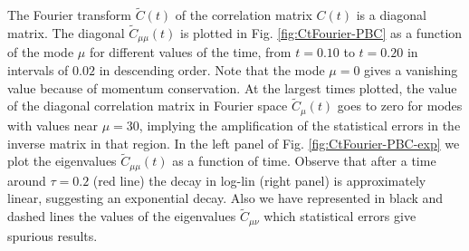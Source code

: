 \documentclass[b5paper,openright,10pt]{book}
\begin{document}
The Fourier transform $\tilde{C}(t)$  of the correlation matrix $C(t)$
is a diagonal matrix.  The diagonal $\tilde{C}_{\mu\mu}(t)$ is plotted
in Fig.   \ref{fig:CtFourier-PBC} as a function of the mode
$\mu$      for      different       values      of      the      time,
from $t=0.10$ to $t=0.20$ in intervals of $0.02$ in  descending   order.   Note that the  mode
$\mu=0$ gives a vanishing value  because of momentum conservation. At the largest times plotted,
the  value  of  the  diagonal  correlation  matrix  in  Fourier  space
$\tilde{C}_\mu(t)$ goes to  zero for modes with  values near $\mu=30$,
implying the  amplification of the  statistical errors in  the inverse
matrix in that  region.  In the left panel of Fig.  \ref{fig:CtFourier-PBC-exp} we
plot the  eigenvalues $\tilde{C}_{\mu\mu}(t)$  as a function  of time.
Observe  that after  a time  around  $\tau=0.2$ (red line) the  decay in  log-lin
(right  panel) is  approximately  linear,  suggesting an  exponential
decay. Also we have represented in black and dashed lines the values of the eigenvalues $\tilde{C}_{\mu\nu}$ which statistical errors give spurious results. 
\end{document}
